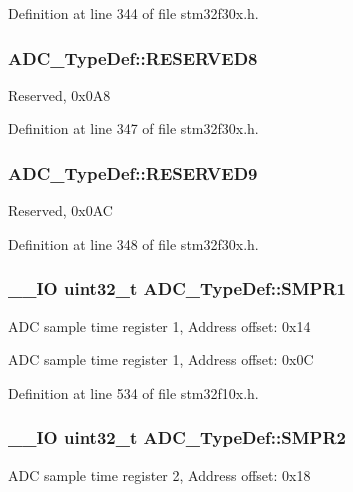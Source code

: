 Definition at line 344 of file stm32f30x.\-h.

\hypertarget{struct_a_d_c___type_def_a0ba5631f55ff82a9a375d4b0e6b63467}{
\subsubsection[{R\-E\-S\-E\-R\-V\-E\-D8}]{ A\-D\-C\-\_\-\-Type\-Def\-::\-R\-E\-S\-E\-R\-V\-E\-D8}}\label{struct_a_d_c___type_def_a0ba5631f55ff82a9a375d4b0e6b63467}
Reserved, 0x0\-A8 

Definition at line 347 of file stm32f30x.\-h.

\hypertarget{struct_a_d_c___type_def_a35454801a099515a661b1fee41e4736b}{
\subsubsection[{R\-E\-S\-E\-R\-V\-E\-D9}]{ A\-D\-C\-\_\-\-Type\-Def\-::\-R\-E\-S\-E\-R\-V\-E\-D9}}\label{struct_a_d_c___type_def_a35454801a099515a661b1fee41e4736b}
Reserved, 0x0\-A\-C 

Definition at line 348 of file stm32f30x.\-h.

\hypertarget{struct_a_d_c___type_def_a73009a8122fcc628f467a4e997109347}{
\subsubsection[{S\-M\-P\-R1}]{\setlength{\rightskip}{0pt plus 5cm}\-\_\-\-\_\-\-I\-O {\bf uint32\-\_\-t} A\-D\-C\-\_\-\-Type\-Def\-::\-S\-M\-P\-R1}}\label{struct_a_d_c___type_def_a73009a8122fcc628f467a4e997109347}
A\-D\-C sample time register 1, Address offset\-: 0x14

A\-D\-C sample time register 1, Address offset\-: 0x0\-C 

Definition at line 534 of file stm32f10x.\-h.

\hypertarget{struct_a_d_c___type_def_a9e68fe36c4c8fbbac294b5496ccf7130}{
\subsubsection[{S\-M\-P\-R2}]{\setlength{\rightskip}{0pt plus 5cm}\-\_\-\-\_\-\-I\-O {\bf uint32\-\_\-t} A\-D\-C\-\_\-\-Type\-Def\-::\-S\-M\-P\-R2}}\label{struct_a_d_c___type_def_a9e68fe36c4c8fbbac294b5496ccf7130}
A\-D\-C sample time register 2, Address offset\-: 0x18

